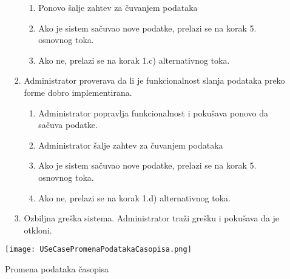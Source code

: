 \documentclass[a4paper]{article}
\begin{document}
\begin{itemize}
\begin{enumerate}
\begin{enumerate}
                    \begin{enumerate}
                        \item Ponovo šalje zahtev za čuvanjem podataka
                        \item Ako je sistem sačuvao nove podatke, prelazi se na korak 5. osnovnog toka.
                        \item Ako ne, prelazi se na korak 1.c) alternativnog toka.
                    \end{enumerate}
                    \item Administrator proverava da li je funkcionalnost slanja podataka preko forme dobro implementirana.
                    \begin{enumerate}
                        \item Administrator popravlja funkcionalnost i pokušava ponovo da sačuva podatke.
                        \item Administrator šalje zahtev za čuvanjem podataka
                        \item Ako je sistem sačuvao nove podatke, prelazi se na korak 5. osnovnog toka.
                        \item Ako ne, prelazi se na korak 1.d) alternativnog toka.
                    \end{enumerate}
                    \item Ozbiljna greška sistema. Administrator traži grešku i pokušava da je otkloni.
                \end{enumerate}
        \end{enumerate}
\end{itemize}

\begin{figure}[hbt!]
    \centering
    \texttt{[image: USeCasePromenaPodatakaCasopisa.png]}
    \caption{Promena podataka časopisa}
    \label{fig:my_label}
\end{figure}
\end{document}
